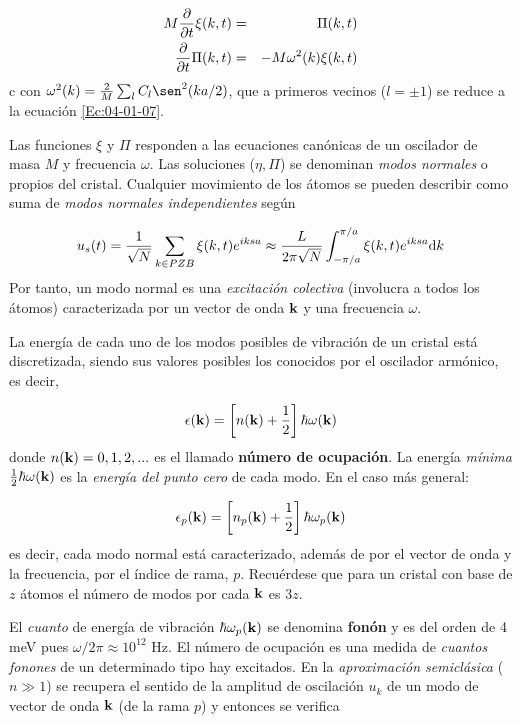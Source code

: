 \begin{eqnarray}
    M \frac{\partial }{\partial t} \xi (k,t) & = & \Pi (k,t) \\
    \frac{\partial }{\partial t} \Pi (k,t) & =  & - M \omega^2 (k) \xi (k,t)    
\end{eqnarray}c
con $\omega^2 (k) = \frac{2}{M} \sum_l C_l \sen^2 ( ka/2)$, que a primeros vecinos ($l=\pm 1$) se reduce a la ecuación \ref{Ec:04-01-07}.

Las funciones $\xi$ y $\Pi$ responden a las ecuaciones canónicas de un oscilador de masa $M$ y frecuencia $\omega$. Las soluciones ($\eta,\Pi$) se denominan \textit{modos normales} o propios del cristal. Cualquier movimiento de los átomos se pueden describir como suma de \textit{modos normales independientes} según

\begin{equation}
    u_s (t) = \frac{1}{\sqrt{N}} \sum_{k \in PZB} \xi (k,t) e^{iksa} \approx \frac{L}{2\pi \sqrt{N}} \int_{-\pi/a}^{\pi/a} \xi (k,t) e^{iksa} \mathrm{d} k
\end{equation}
Por tanto, un modo normal es una \textit{excitación colectiva} (involucra a todos los átomos) caracterizada por un vector de onda $\mathbf{k}$ y una frecuencia $\omega$. 

La energía de cada uno de los modos posibles de vibración de un cristal está discretizada, siendo sus valores posibles los conocidos por el oscilador armónico, es decir,

\begin{equation}
    \epsilon (\mathbf{k}) = \left[ n(\mathbf{k}) + \frac{1}{2} \right] \hbar \omega (\mathbf{k})
\end{equation}
donde $n(\mathbf{k})=0,1,2,...$ es el llamado \textbf{número de ocupación}. La energía \textit{mínima} $\frac{1}{2} \hbar \omega (\mathbf{k})$ es la \textit{energía del punto cero} de cada modo. En el caso más general:
 
\begin{equation}
    \epsilon_p (\mathbf{k}) = \left[ n_p(\mathbf{k}) + \frac{1}{2} \right] \hbar \omega_p ( \mathbf{k})
\end{equation}
es decir, cada modo normal está caracterizado, además de por el vector de onda y la frecuencia, por el índice de rama, $p$. Recuérdese que para un cristal con base de $z$ átomos el número de modos por cada $\mathbf{k}$ es $3z$.  

El \textit{cuanto} de energía de vibración $\hbar \omega_p (\mathbf{k})$ se denomina \textbf{fonón} y es del orden de 4 meV pues $\omega/2\pi\approx 10^{12} $ Hz. El número de ocupación es una medida de \textit{cuantos fonones} de un determinado tipo hay excitados. En la \textit{aproximación semiclásica} ($n\gg 1$) se recupera el sentido de la amplitud de oscilación $u_k$ de un modo de vector de onda $\mathbf{k}$ (de la rama $p$) y entonces se verifica 


